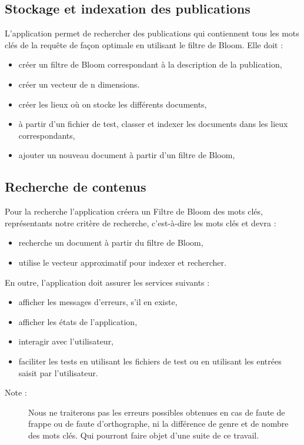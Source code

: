 \documentclass[a4paper,12pt]{report}
\begin{document}
		\subsection{Stockage et indexation des publications}
		L’application permet de rechercher des publications qui contiennent tous les mots clés de la requête de façon optimale en utilisant le filtre de Bloom. Elle doit :
	\begin{itemize}
	
	\item créer un filtre de Bloom correspondant à la description de la publication, 
	\item créer un vecteur de n dimensions.
	\item créer les lieux où on stocke les différents documents,
	\item à partir d'un fichier de test, classer et indexer les documents dans les lieux correspondants,		
	\item ajouter un nouveau document à partir d'un filtre de Bloom,				\end{itemize}
	
	\subsection{Recherche de contenus}
	Pour la recherche l’application créera un Filtre de Bloom des mots clés, représentants notre critère de recherche, c’est-à-dire les mots clés et devra :
	\begin{itemize}
		\item recherche un document à partir du filtre de Bloom,
 		\item utilise le vecteur approximatif pour indexer et rechercher.
	\end{itemize}
	
En outre, l’application doit assurer les services suivants :

	\begin{itemize}
	\item afficher les messages d'erreurs, s'il en existe,	
	\item afficher les états de l'application,	
	\item interagir avec l'utilisateur,
	\item faciliter les tests en utilisant les fichiers de test ou en utilisant les entrées saisit par l'utilisateur.
	\end{itemize}
	\begin{description}
		\item[Note :] Nous ne traiterons pas les erreurs  possibles obtenues en cas de faute de frappe ou de faute d’orthographe, ni la différence de genre et de nombre des mots clés. Qui pourront faire objet d’une suite de ce travail.
			\end{description}
\end{document}
